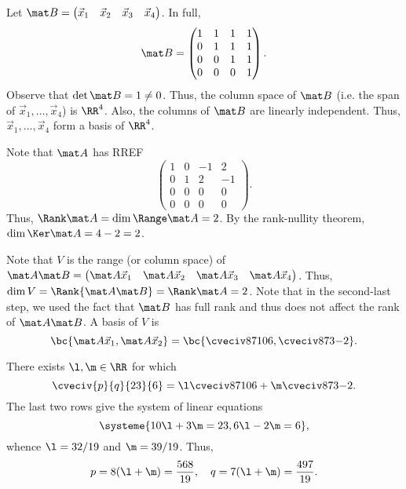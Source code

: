 \begin{solution}
    \begin{ppart}
        Let $\mat B = \begin{pmatrix}\vec x_1 & \vec x_2 & \vec x_3 & \vec x_4\end{pmatrix}$. In full, \[\mat B = \begin{pmatrix}1 & 1 & 1 & 1 \\ 0 & 1 & 1 & 1 \\ 0 & 0 & 1 & 1 \\ 0 & 0 & 0 & 1\end{pmatrix}.\] Observe that $\det \mat B = 1 \neq 0$. Thus, the column space of $\mat B$ (i.e. the span of $\vec x_1, \dots, \vec x_4$) is $\RR^4$. Also, the columns of $\mat B$ are linearly independent. Thus, $\vec x_1, \dots, \vec x_4$ form a basis of $\RR^4$.
    \end{ppart}
    \begin{ppart}
        Note that $\mat A$ has RREF \[\begin{pmatrix}1 & 0 & -1 & 2 \\ 0 & 1 & 2 & -1 \\ 0 & 0 & 0 & 0 \\ 0 & 0 & 0 & 0\end{pmatrix}.\] Thus, $\Rank \mat A = \dim \Range \mat A = 2$. By the rank-nullity theorem, $\dim \Ker \mat A = 4 - 2 = 2$.
    \end{ppart}
    \begin{ppart}
        Note that $V$ is the range (or column space) of $\mat A \mat B = \begin{pmatrix}\mat A \vec x_1 & \mat A \vec x_2 & \mat A \vec x_3 & \mat A \vec x_4 \end{pmatrix}$. Thus, $\dim V = \Rank{\mat A \mat B} = \Rank \mat A = 2$. Note that in the second-last step, we used the fact that $\mat B$ has full rank and thus does not affect the rank of $\mat A \mat B$. A basis of $V$ is \[\bc{\mat A \vec x_1, \mat A \vec x_2} = \bc{\cveciv87{10}6, \cveciv873{-2}}.\]
    \end{ppart}
    \begin{ppart}
        There exists $\l, \m \in \RR$ for which \[\cveciv{p}{q}{23}{6} = \l \cveciv87{10}6 + \m \cveciv873{-2}.\] The last two rows give the system of linear equations \[\systeme{10\l + 3\m = 23, 6\l - 2\m = 6},\] whence $\l = 32/19$ and $\m = 39/19$. Thus, \[p = 8(\l + \m) = \frac{568}{19}, \quad q = 7(\l + \m) = \frac{497}{19}.\]
    \end{ppart}
\end{solution}